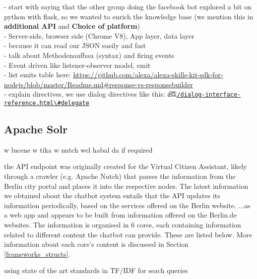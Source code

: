 	- start with saying that the other group doing the facebook bot explored a bit on python with flask, so we wanted to enrich the knowledge base (we mention this in \textbf{additional API }and \textbf{Choice of platform})\\
	- Server-side, browser side (Chrome V8), App layer, data layer\\
	- because it can read our JSON easily and fast\\
	- talk about Methodenaufbau (syntax) and firing events\\
	- Event driven like listener-observer model, emit\\
	- list emits table here: \url{https://github.com/alexa/alexa-skills-kit-sdk-for-nodejs/blob/master/Readme.md#response-vs-responsebuilder}\\
	- explain directives, we use dialog directives like this: \t{a\t{sk}}\href{https://developer.amazon.com/docs/custom-skills/dialog-interface-reference.html\#delegate}{\lstinline|/dialog-interface-reference.html\#delegate|}	



\subsection*{Apache Solr}
\label{Solr}
w lucene w tika w nutch wel habal da if required

the API endpoint was originally created for the Virtual Citizen Assistant, likely through a crawler (e.g. Apache Nutch) that parses the information from the Berlin city portal and places it into the respective nodes. The latest information we obtained about the chatbot system entails that the API updates its information periodically, based on the services offered on the Berlin website. 
...as a web app and appears to be built from information offered on the Berlin.de websites. The information is organised in 6 cores, each containing information related to different content the chatbot can provide. These are listed below. More information about each core's content is discussed in Section \ref{frameworks_structs}.


using state of the art standards in TF/IDF for seach queries


